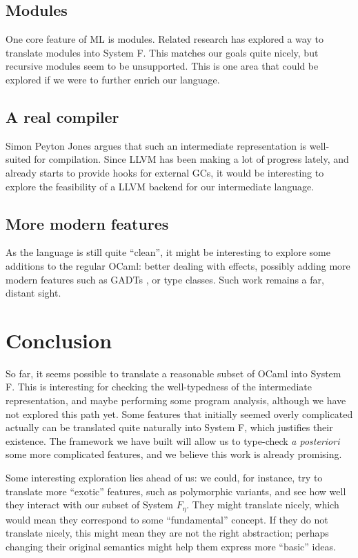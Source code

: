 \documentclass[10pt,a4paper,twoside,titlepage,twocolumn]{article}
\begin{document}
\subsection{Modules}

One core feature of ML is modules. Related research \cite{rossberg2010f} has
explored a way to translate modules into System F. This matches our goals quite
nicely, but recursive modules seem to be unsupported. This is one area that
could be explored if we were to further enrich our language.

\subsection{A real compiler}

Simon Peyton Jones argues \cite{sulzmann2007system} that such an intermediate
representation is well-suited for compilation. Since LLVM \cite{llvm} has been
making a lot of progress lately, and already starts to provide hooks for
external GCs, it would be interesting to explore the feasibility of a LLVM
backend for our intermediate language.

\subsection{More modern features}

As the language is still quite ``clean'', it might be interesting to explore
some additions to the regular OCaml: better dealing with effects, possibly
adding more modern features such as GADTs \cite{simonet2004constraint}, or type
classes. Such work remains a far, distant sight.

\section{Conclusion}

So far, it seems possible to translate a reasonable subset of OCaml into System
F. This is interesting for checking the well-typedness of the intermediate
representation, and maybe performing some program analysis, although we have not
explored this path yet. Some features that initially seemed overly complicated
actually can be translated quite naturally into System F, which justifies their
existence. The framework we have built will allow us to type-check \emph{a
posteriori} some more complicated features, and we believe this work is already
promising.

Some interesting exploration lies ahead of us: we could, for instance, try to
translate more ``exotic'' features, such as polymorphic variants, and see how
well they interact with our subset of System $F_\eta$. They might translate
nicely, which would mean they correspond to some ``fundamental'' concept. If
they do not translate nicely, this might mean they are not the right
abstraction; perhaps changing their original semantics might help them express
more ``basic'' ideas.
\end{document}
